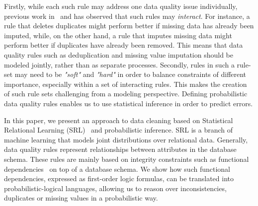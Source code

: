 Firstly, while each such rule may address one data quality issue individually, previous work in~\cite{fan2012foundations} and \cite{Fan:2014:IRM:2628135.2567657} has observed that such rules may \textit{interact}. For instance, a rule that deletes duplicates might perform better if missing data has already been imputed, while, on the other hand, a rule that imputes missing data might perform better if duplicates have already been removed. This means that data quality rules such as deduplication and missing value imputation should be modeled jointly, rather than as separate processes.
Secondly, rules in such a rule-set may need to be \textit{"soft"} and \textit{"hard"} in order to balance constraints of different importance, especially within a set of interacting rules. This makes the creation of such rule sets challenging from a modeling perspective. Defining probabilistic data quality rules enables us to use statistical inference in order to predict errors. 


In this paper, we present an approach to data cleaning based on Statistical Relational Learning (SRL)~\cite{getoor2007introduction} and probabilistic inference. SRL is a branch of machine learning that models joint distributions over relational data. Generally, data quality rules represent relationships between attributes in the database schema. These rules are mainly based on integrity constraints such as functional dependencies~\cite{AbiteboulHV95} on top of a database schema. We show how such functional dependencies, expressed as first-order logic formulas, can be translated into probabilistic-logical languages, allowing us to reason over inconsistencies, duplicates or missing values in a probabilistic way.



